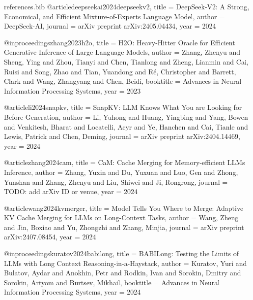 \begin{filecontents}[overwrite]{references.bib}
@article{deepseekai2024deepseekv2,
  title   = {{DeepSeek-V2}: A Strong, Economical, and Efficient Mixture-of-Experts Language Model},
  author  = {{DeepSeek-AI}},
  journal = {arXiv preprint arXiv:2405.04434},
  year    = {2024}
}


@inproceedings{zhang2023h2o,
  title     = {{H2O}: Heavy-Hitter Oracle for Efficient Generative Inference of Large Language Models},
  author    = {Zhang, Zhenyu and Sheng, Ying and Zhou, Tianyi and Chen, Tianlong and
               Zheng, Lianmin and Cai, Ruisi and Song, Zhao and Tian, Yuandong and
               R{\'e}, Christopher and Barrett, Clark and Wang, Zhangyang and Chen, Beidi},
  booktitle = {Advances in Neural Information Processing Systems},
  year      = {2023}
}

@article{li2024snapkv,
  title   = {{SnapKV}: {LLM} Knows What You are Looking for Before Generation},
  author  = {Li, Yuhong and Huang, Yingbing and Yang, Bowen and Venkitesh, Bharat and
             Locatelli, Acyr and Ye, Hanchen and Cai, Tianle and Lewis, Patrick and Chen, Deming},
  journal = {arXiv preprint arXiv:2404.14469},
  year    = {2024}
}

@article{zhang2024cam,
  title   = {{CaM}: Cache Merging for Memory-efficient {LLMs} Inference},
  author  = {Zhang, Yuxin and Du, Yuxuan and Luo, Gen and Zhong, Yunshan and
             Zhang, Zhenyu and Liu, Shiwei and Ji, Rongrong},
  journal = {TODO: add arXiv ID or venue},
  year    = {2024}
}

@article{wang2024kvmerger,
  title   = {Model Tells You Where to Merge: Adaptive {KV} Cache Merging for {LLMs} on Long-Context Tasks},
  author  = {Wang, Zheng and Jin, Boxiao and Yu, Zhongzhi and Zhang, Minjia},
  journal = {arXiv preprint arXiv:2407.08454},
  year    = {2024}
}


@inproceedings{kuratov2024babilong,
  title     = {{BABILong}: Testing the Limits of {LLMs} with Long Context Reasoning-in-a-Haystack},
  author    = {Kuratov, Yuri and Bulatov, Aydar and Anokhin, Petr and Rodkin, Ivan and
               Sorokin, Dmitry and Sorokin, Artyom and Burtsev, Mikhail},
  booktitle = {Advances in Neural Information Processing Systems},
  year      = {2024}
}


\end{filecontents}
